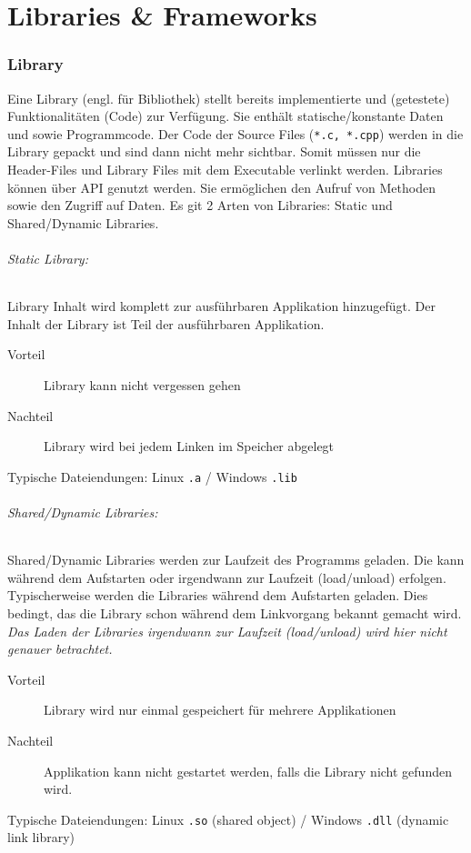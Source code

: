\part{Libraries \& Frameworks}

\section{Library}
Eine Library (engl. für Bibliothek) stellt bereits implementierte und (getestete) Funktionalitäten (Code) zur Verfügung. Sie enthält statische/konstante Daten und sowie Programmcode. Der Code der Source Files (\texttt{*.c, *.cpp}) werden in die Library gepackt und sind dann nicht mehr sichtbar. Somit müssen nur die Header-Files und Library Files mit dem Executable verlinkt werden. Libraries können über API genutzt werden. Sie ermöglichen den Aufruf von Methoden sowie den Zugriff auf Daten. Es git 2 Arten von Libraries: Static und Shared/Dynamic Libraries.

\paragraph{Static Library:}
Library Inhalt wird komplett zur ausführbaren Applikation hinzugefügt. Der Inhalt der Library ist Teil der ausführbaren Applikation.
\begin{description}
    \item[Vorteil] Library kann nicht vergessen gehen
    \item[Nachteil] Library wird bei jedem Linken im Speicher abgelegt
\end{description}
Typische Dateiendungen: Linux \texttt{.a} / Windows \texttt{.lib}

\paragraph{Shared/Dynamic Libraries:}
Shared/Dynamic Libraries werden zur Laufzeit des Programms geladen. Die kann während dem Aufstarten oder irgendwann zur Laufzeit (load/unload) erfolgen. Typischerweise werden die Libraries während dem Aufstarten geladen. Dies bedingt, das die Library schon während dem Linkvorgang bekannt gemacht wird. \emph{Das Laden der Libraries irgendwann zur Laufzeit (load/unload) wird hier nicht genauer betrachtet.}
\begin{description}
    \item[Vorteil] Library wird nur einmal gespeichert für mehrere Applikationen
    \item[Nachteil] Applikation kann nicht gestartet werden, falls die Library nicht gefunden wird.
\end{description}
Typische Dateiendungen: Linux \texttt{.so} (shared object) / Windows \texttt{.dll} (dynamic link library)

